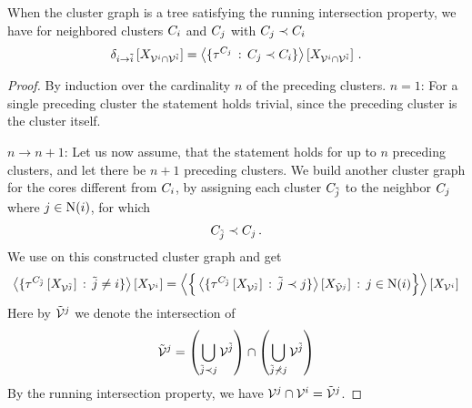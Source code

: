 \begin{lemma}\label{lem:clusterContractionMessage}
	When the cluster graph is a tree satisfying the running intersection property, we have for neighbored clusters $C_{i}$ and $C_{j}$ with $C_{j}\prec C_{i}$
	\begin{align*}
		\delta_{i \rightarrow \tilde{i}}\left[X_{\mathcal{V}^{i}\cap\mathcal{V}^{\tilde{i}}}\right]
		= \left\langle \{\tau^{C_{j}}\,:\,C_{j}\prec C_{i}\}\right\rangle \left[ X_{\mathcal{V}^{i}\cap\mathcal{V}^{\tilde{i}}} \right]   \, .
	\end{align*}
\end{lemma}
\begin{proof}
	By induction over the cardinality $n$ of the preceding clusters.
	\textbf{$n=1$}: For a single preceding cluster the statement holds trivial, since the preceding cluster is the cluster itself.

	\textbf{$n\rightarrow n+1$}: Let us now assume, that the statement holds for up to $n$ preceding clusters, and let there be $n+1$ preceding clusters.
	We build another cluster graph for the cores different from $C_{i}$, by assigning each cluster $C_{\tilde{j}}$ to the neighbor $C_{j}$ where $j\in\mathrm{N}(i)$, for which
	\begin{align*}
		C_{\tilde{j}}\prec C_{j} \, .
	\end{align*}
	We use  on this constructed cluster graph and get
	\begin{align*}
		\left\langle \{\tau^{C_{\tilde{j}}}\left[X_{\mathcal{V}^{\tilde{j}}}\right] \, : \, \tilde{j}\neq i\}\right\rangle \left[ X_{\mathcal{V}^{i}} \right]
		= \left\langle 
			\Big\{ \left\langle 
				\{\tau^{C_{\tilde{j}}}\left[X_{\mathcal{V}^{\tilde{j}}}\right] \, : \, \tilde{j}\prec j\}
			\right\rangle \left[ X_{\tilde{\mathcal{V}}^{j}} \right]
			\, : \, j\in\mathrm{N}(i) \Big\}
			\right\rangle \left[ X_{\mathcal{V}^{i}} \right]
	\end{align*}
	Here by $\tilde{\mathcal{V}}^{j}$ we denote the intersection of
	\begin{align*}
		\tilde{\mathcal{V}}^{j} = \left(\bigcup_{\tilde{j}\prec j} \mathcal{V}^{\tilde{j}}\right) \cap \left(\bigcup_{\tilde{j}\nprec j} \mathcal{V}^{\tilde{j}}\right)
	\end{align*}
	By the running intersection property, we have $\mathcal{V}^{j}\cap\mathcal{V}^{i}=\tilde{\mathcal{V}}^{j}$.


\end{proof}
